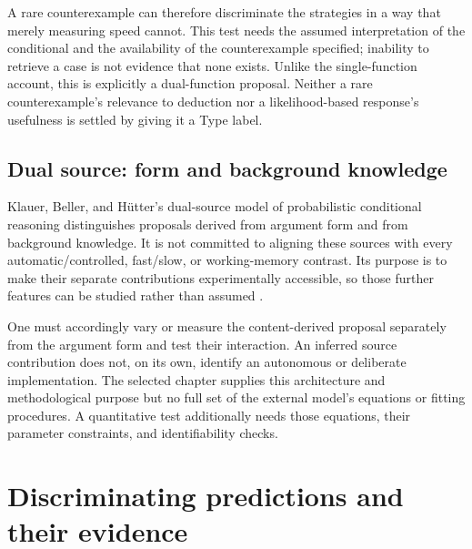A rare counterexample can therefore discriminate the strategies in a
way that merely measuring speed cannot. This test needs the assumed
interpretation of the conditional and the availability of the counterexample
specified; inability to retrieve a case is not evidence that none exists.
Unlike the single-function account, this is explicitly a dual-function
proposal. Neither a rare counterexample's relevance to deduction nor a
likelihood-based response's usefulness is settled by giving it a Type label.

\subsection{Dual source: form and background knowledge}

Klauer, Beller, and H\"utter's dual-source model of probabilistic conditional
reasoning distinguishes proposals derived from argument form and from
background knowledge. It is not committed to aligning these sources
with every automatic/controlled, fast/slow, or working-memory contrast.
Its purpose is to make their separate contributions experimentally
accessible, so those further features can be studied rather than assumed
\cite[p.~177]{Klauer2021DualProcess}.

One must accordingly vary or measure the content-derived proposal
separately from the argument form and test their interaction. An inferred
source contribution does not, on its own, identify an autonomous or
deliberate implementation. The selected chapter supplies this architecture
and methodological purpose but no full set of the external model's
equations or fitting procedures. A quantitative test additionally needs
those equations, their parameter constraints, and identifiability checks.

\section{Discriminating predictions and their evidence}

